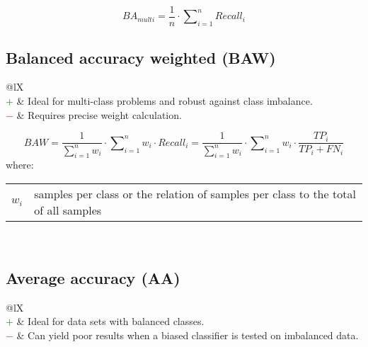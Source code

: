 \documentclass{article}
\makeatletter
\newenvironment{conditions}[1][where:]
    {\hspace{0.02\textwidth} #1 \begin{tabular}[t]{>{$}l<{$} @{${}={}$} l}}
    {\end{tabular}\\[\belowdisplayskip]}
\makeatother
\begin{document}
\begin{equation}
    \textit{BA}_\textit{multi} = \dfrac{1}{n} \cdot \sum\nolimits_{i = 1}^n \textit{Recall}_i
%
    \label{equation:BA_multi}
\end{equation}


\subsection[Balanced accuracy weighted (BAW)]{Balanced accuracy weighted (BAW) \cite{salman2017detection, infante2023factors}}

\begin{table}[H]\centering
    \begin{tabularx}{\textwidth}{@{}lX}
         \\
        \textcolor{Green}{$+$} & Ideal for multi-class problems and robust against class imbalance. \\
        \textcolor{Red}{$-$}   & Requires precise weight calculation.
    \end{tabularx}
\end{table}

\begin{equation}
    \textit{BAW} = \dfrac{1}{\sum\nolimits_{i = 1}^n w_i} \cdot \sum\nolimits_{i = 1}^n w_i \cdot \textit{Recall}_i = \dfrac{1}{\sum\nolimits_{i = 1}^n w_i} \cdot \sum\nolimits_{i = 1}^n w_i \cdot \dfrac{\textit{TP}_i}{\textit{TP}_i + \textit{FN}_i}
%
    \label{equation:BAW}
\end{equation}
%
\begin{conditions}
    w_i & samples per class or the relation of samples per class to the total of all samples
\end{conditions}


\subsection[Average accuracy (AA)]{Average accuracy (AA) \cite{brodersen2010balanced, huang2019ecg}}

\begin{table}[H]\centering
    \begin{tabularx}{\textwidth}{@{}lX}
         \\
        \textcolor{Green}{$+$} & Ideal for data sets with balanced classes. \\
        \textcolor{Red}{$-$}   & Can yield poor results when a biased classifier is tested on imbalanced data.
    \end{tabularx}
\end{table}
\end{document}
